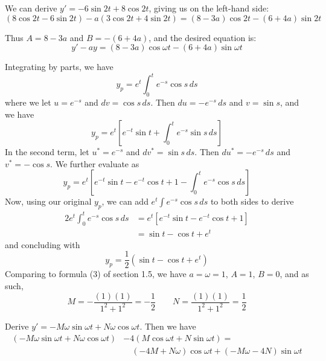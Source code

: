 \documentclass[a4paper]{article}
\begin{document}

We can derive \(y' = -6 \sin 2t + 8 \cos 2t\), giving us on the left-hand side:
\[
	\!\left( 8 \cos 2t - 6 \sin 2t \right) - a \!\left( 3 \cos 2t + 4 \sin 2t \right) = \!\left( 8 - 3a \right) \cos 2t - \!\left( 6 + 4a \right) \sin 2t 
\]

Thus \(A = 8 - 3a\) and \(B = - \!\left( 6 + 4a \right) \), and the desired equation is:
\[
	y' - ay = \!\left( 8 - 3a \right) \cos \omega t - \!\left( 6 + 4a \right) \sin \omega t
\]


Integrating by parts, we have
\[
	y_{p} = e^{t} \int^{t}_{0} e^{-s} \cos s \, ds 
\]
where we let \(u = e^{-s}\) and \(dv = \cos s \, ds\). Then \(du = -e^{-s} \, ds\) and \(v = \sin s\), and we have
\[
	y_{p} = e^{t} \left[ e^{-t} \sin t + \int^{t}_{0} e^{-s} \sin s \, ds   \right] 
\]
In the second term, let \(u^{*} = e^{-s}\) and \(dv^{*} = \sin s \, ds \). Then \(du^{*} = -e^{-s} \, ds \) and \(v^{*} = -\cos s\). We further evaluate as
\[
	y_{p} = e^{t} \left[ e^{-t} \sin t - e^{-t} \cos t + 1 - \int^{t}_{0} e^{-s} \cos s \, ds   \right] 
\]
Now, using our original \(y_{p}\), we can add \(e^{t} \int e^{-s} \cos s \, ds \) to both sides to derive
\begin{align*} 
	2e^{t} \int^{t}_{0} e^{-s} \cos s \, ds & = e^{t} \left[ e^{-t} \sin t - e^{-t} \cos t + 1 \right] \\
						& = \sin t - \cos t + e^{t}
\end{align*}
and concluding with
\[
	y_{p} = \frac{1}{2} \!\left( \sin t - \cos t + e^{t} \right) 
\]
Comparing to formula (3) of section 1.5, we have \(a = \omega = 1\), \(A = 1\), \(B = 0\), and as such,
\[
	M = -\frac{\!\left( 1 \right) \!\left( 1 \right) }{1^{2} + 1^{2}} = -\frac{1}{2} \qquad N = \frac{\!\left( 1 \right) \!\left( 1 \right) }{1^{2} + 1^{2}} = \frac{1}{2}
\]


Derive \(y' = -M \omega \sin \omega t + N \omega \cos \omega t\). Then we have
\begin{align*}
	\!\left( - M \omega \sin \omega t + N \omega \cos \omega t \right) & - 4 \!\left( M \cos \omega t + N \sin \omega t \right) = \\
	& \quad \!\left( -4M + N \omega  \right) \cos \omega t + \!\left( -M \omega - 4N \right) \sin \omega t 
\end{align*}
\end{document}
